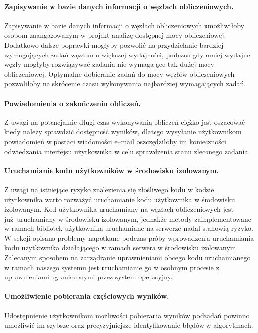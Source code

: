 \documentclass[a4paper,11pt,twoside]{report}
\theoremstyle{definition}
\begin{document}
        \paragraph{Zapisywanie w bazie danych informacji o węzłach obliczeniowych.}
        Zapisywanie w bazie danych informacji o węzłach obliczeniowych umożliwiłoby osobom zaangażowanym w projekt analizę dostępnej mocy obliczeniowej. 
        Dodatkowo dalsze poprawki mogłyby pozwolić na przydzielanie bardziej wymagających zadań węzłom o większej wydajności, podczas gdy mniej wydajne węzły mogłyby rozwiązywać zadania nie wymagające tak dużej mocy obliczeniowej.
        Optymalne dobieranie zadań do mocy węzłów obliczeniowych pozwoliłoby na skrócenie czasu wykonywania najbardziej wymagających zadań.
        
        \paragraph{Powiadomienia o zakończeniu obliczeń.}
        Z uwagi na potencjalnie długi czas wykonywania obliczeń ciężko jest oszacować kiedy należy sprawdzić dostępność wyników, dlatego wysyłanie użytkownikom powiadomień w postaci wiadomości e--mail oszczędziłoby im konieczności odwiedzania interfejsu użytkownika w celu sprawdzenia stanu zleconego zadania.
        
        \paragraph{Uruchamianie kodu użytkowników w środowisku izolowanym.}
        Z uwagi na istniejące ryzyko znalezienia się złośliwego kodu w kodzie użytkownika warto rozważyć uruchamianie kodu użytkownika w środowisku izolowanym. Kod użytkownika uruchamiany na węzłach obliczeniowych jest już uruchamiany w środowisku izolowanym, jednakże metody zaimplementowane w ramach bibliotek użytkownika uruchamiane na serwerze nadal stanowią ryzyko.
        W sekcji %
        opisano problemy napotkane podczas próby wprowadzenia uruchamiania kodu użytkownika działającego w ramach serwera w środowisku izolowanym. 
        Zalecanym sposobem na zarządzanie uprawnieniami obcego kodu uruchamianego w ramach naszego systemu jest uruchamianie go w osobnym procesie z uprawnieniami ograniczonymi przez system operacyjny.
        
        \paragraph{Umożliwienie pobierania częściowych wyników.}
        Udostępnienie użytkownikom możliwości pobierania wyników podzadań powinno umożliwić im szybsze oraz precyzyjniejsze identyfikowanie błędów w algorytmach.
\end{document}
